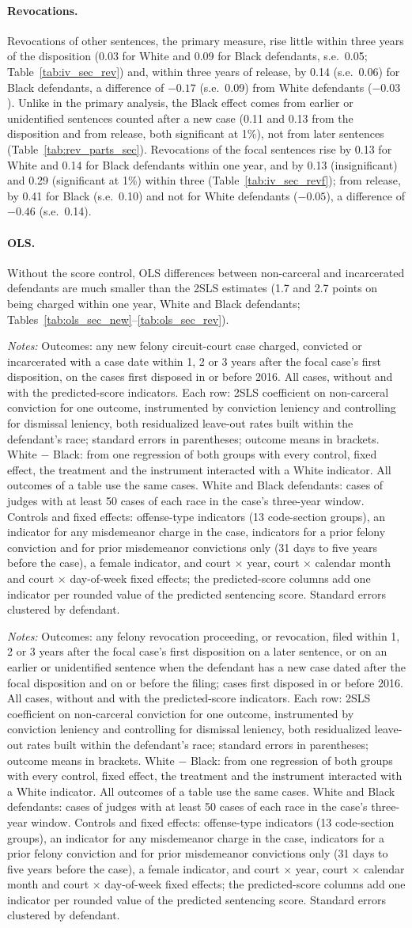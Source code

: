 \documentclass[11pt]{article}
\newcommand{\tabnote}[1]{\par\vspace{0.6ex}\begin{minipage}{\linewidth}\linespread{1}\footnotesize\textit{Notes:} #1\end{minipage}}
\newcommand{\controlsnote}{offense-type indicators (13 code-section groups), an indicator for any misdemeanor charge in the case, indicators for a prior felony conviction and for prior misdemeanor convictions only (31 days to five years before the case), a female indicator, and court $\times$ year, court $\times$ calendar month and court $\times$ day-of-week fixed effects}
\newcommand{\specnotesec}{Controls and fixed effects: \controlsnote; the predicted-score columns add one indicator per rounded value of the predicted sentencing score. Standard errors clustered by defendant.}
\newcommand{\racesamplenote}{White and Black defendants: cases of judges with at least 50 cases of each race in the case's three-year window.}
\newcommand{\ivnote}{Each row: 2SLS coefficient on non-carceral conviction for one outcome, instrumented by conviction leniency and controlling for dismissal leniency, both residualized leave-out rates built within the defendant's race; standard errors in parentheses; outcome means in brackets. White $-$ Black: from one regression of both groups with every control, fixed effect, the treatment and the instrument interacted with a White indicator. All outcomes of a table use the same cases. \racesamplenote}
\begin{document}
\paragraph{Revocations.} Revocations of other sentences, the primary measure, rise little within three years of the disposition (0.03 for White and 0.09 for Black defendants, s.e.\ 0.05; Table~\ref{tab:iv_sec_rev}) and, within three years of release, by 0.14 (s.e.\ 0.06) for Black defendants, a difference of $-0.17$ (s.e.\ 0.09) from White defendants ($-0.03$). Unlike in the primary analysis, the Black effect comes from earlier or unidentified sentences counted after a new case (0.11 and 0.13 from the disposition and from release, both significant at 1\%), not from later sentences (Table~\ref{tab:rev_parts_sec}). Revocations of the focal sentences rise by 0.13 for White and 0.14 for Black defendants within one year, and by 0.13 (insignificant) and 0.29 (significant at 1\%) within three (Table~\ref{tab:iv_sec_revf}); from release, by 0.41 for Black (s.e.\ 0.10) and not for White defendants ($-0.05$), a difference of $-0.46$ (s.e.\ 0.14).

\paragraph{OLS.} Without the score control, OLS differences between non-carceral and incarcerated defendants are much smaller than the 2SLS estimates (1.7 and 2.7 points on being charged within one year, White and Black defendants; Tables~\ref{tab:ols_sec_new}--\ref{tab:ols_sec_rev}).

\begin{table}[H]
\centering
\caption{2SLS from the disposition: non-carceral conviction and new felony cases, secondary analysis}\label{tab:iv_sec_new}
{\small\linespread{1}\selectfont\renewcommand{\arraystretch}{0.9}}
\tabnote{Outcomes: any new felony circuit-court case charged, convicted or incarcerated with a case date within 1, 2 or 3 years after the focal case's first disposition, on the cases first disposed in or before 2016. All cases, without and with the predicted-score indicators. \ivnote{} \specnotesec}
\end{table}

\begin{table}[H]
\centering
\caption{2SLS from the disposition: non-carceral conviction and revocations of other sentences, secondary analysis}\label{tab:iv_sec_rev}
{\small\linespread{1}\selectfont\renewcommand{\arraystretch}{0.9}}
\tabnote{Outcomes: any felony revocation proceeding, or revocation, filed within 1, 2 or 3 years after the focal case's first disposition on a later sentence, or on an earlier or unidentified sentence when the defendant has a new case dated after the focal disposition and on or before the filing; cases first disposed in or before 2016. All cases, without and with the predicted-score indicators. \ivnote{} \specnotesec}
\end{table}
\end{document}
